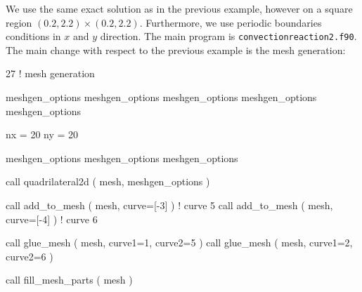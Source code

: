 We use the same exact solution as in the previous example, however on a square
region $(0.2,2.2)\times(0.2,2.2)$. Furthermore, we use periodic boundaries
conditions in $x$ and $y$ direction. 
The main program is \texttt{convectionreaction2.f90}. The main change with
respect to the previous example is the mesh generation:

\begin{listing}{27}
! mesh generation
                                                                                
  meshgen_options%
  meshgen_options%
  meshgen_options%
  meshgen_options%
  meshgen_options%
                                                                                
  nx = 20
  ny = 20
                                                                                
  meshgen_options%
  meshgen_options%
  meshgen_options%
                                                                                
  call quadrilateral2d ( mesh, meshgen_options )
                                                                                
  call add_to_mesh ( mesh, curve=[-3] )  ! curve 5
  call add_to_mesh ( mesh, curve=[-4] )  ! curve 6
                                                                                
  call glue_mesh ( mesh, curve1=1, curve2=5 )
  call glue_mesh ( mesh, curve1=2, curve2=6 )
                                                                                
  call fill_mesh_parts ( mesh )

\end{listing}

